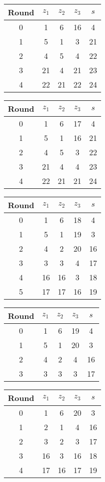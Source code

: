\begin{multicols}{2}
\begin{tabular}{c | c | c | c | c }
Round & $z_1$ & $z_2$ & $z_3$ & $s$ \\
\hline
0 & 1 & 6 & 16 & 4 \\
1 & 5 & 1 & 3 & 21 \\
2 & 4 & 5 & 4 & 22 \\
3 & 21 & 4 & 21 & 23 \\
4 & 22 & 21 & 22 & 24
\end{tabular}


\begin{tabular}{c | c | c | c | c }
Round & $z_1$ & $z_2$ & $z_3$ & $s$ \\
\hline
0 & 1 & 6 & 17 & 4 \\
1 & 5 & 1 & 16 & 21 \\
2 & 4 & 5 & 3 & 22 \\
3 & 21 & 4 & 4 & 23 \\
4 & 22 & 21 & 21 & 24
\end{tabular}


\begin{tabular}{c | c | c | c | c }
Round & $z_1$ & $z_2$ & $z_3$ & $s$ \\
\hline
0 & 1 & 6 & 18 & 4 \\
1 & 5 & 1 & 19 & 3 \\
2 & 4 & 2 & 20 & 16 \\
3 & 3 & 3 & 4 & 17 \\
4 & 16 & 16 & 3 & 18 \\
5 & 17 & 17 & 16 & 19
\end{tabular}


\begin{tabular}{c | c | c | c | c }
Round & $z_1$ & $z_2$ & $z_3$ & $s$ \\
\hline
0 & 1 & 6 & 19 & 4 \\
1 & 5 & 1 & 20 & 3 \\
2 & 4 & 2 & 4 & 16 \\
3 & 3 & 3 & 3 & 17
\end{tabular}


\begin{tabular}{c | c | c | c | c }
Round & $z_1$ & $z_2$ & $z_3$ & $s$ \\
\hline
0 & 1 & 6 & 20 & 3 \\
1 & 2 & 1 & 4 & 16 \\
2 & 3 & 2 & 3 & 17 \\
3 & 16 & 3 & 16 & 18 \\
4 & 17 & 16 & 17 & 19
\end{tabular}



\end{multicols}
